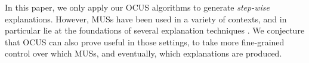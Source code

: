 In this paper, we only apply our OCUS algorithms to generate \emph{step-wise} explanations. However, MUSs have been used in a variety of contexts, and in particular lie at the foundations of several explanation techniques \cite{junker2001quickxplain,ignatiev2019abduction,schotten}. We conjecture that OCUS can also prove useful in those settings, to take more fine-grained control over which MUSs, and eventually, which explanations are produced.




